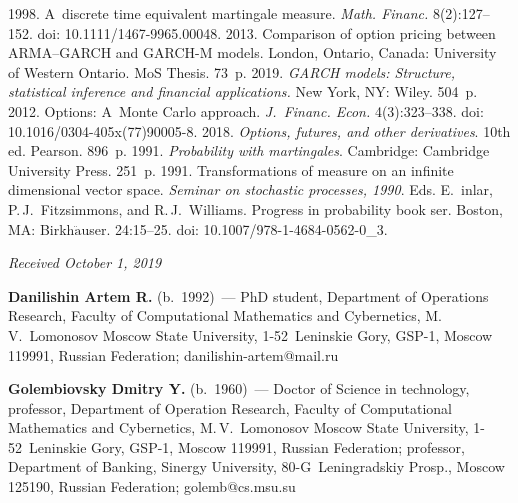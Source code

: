 \begin{multicols}{2}
{{\begin{thebibliography}{99}
 1998. A~discrete time equivalent martingale 
measure. \textit{Math. Financ.} 8(2):127--152. doi: 10.1111/1467-9965.00048.
 2013. Comparison of option pricing between ARMA--GARCH and 
GARCH-M models. London, Ontario, Canada: University of Western Ontario. MoS 
Thesis. 73~p.
 2019. \textit{GARCH models: Structure, 
statistical inference and financial applications.} New York, NY: Wiley. 504~p.
 2012. Options: A~Monte Carlo approach. \textit{J.~Financ. 
Econ.} 4(3):323--338.  doi: 10.1016/0304-405x(77)90005-8.
 2018. \textit{Options, futures, and other derivatives}. 10th ed. Pearson. 
896~p.
 1991. \textit{Probability with martingales}. Cambridge: 
Cambridge University Press. 251~p.
 1991. Transformations of measure on an infinite dimensional vector 
space. \textit{Seminar on stochastic processes, 1990}. Eds. \mbox{E.~{}inlar}, 
P.\,J.~Fitzsimmons, and R.\,J.~Williams. Progress in probability book ser. Boston, MA: 
Birkh$\ddot{\mbox{a}}$user. 
24:15--25. doi: 10.1007/978-1-4684-0562-0\_3.
\end{thebibliography}

 }
 }

\end{multicols}

\vspace*{-3pt}

\hfill{\small\textit{Received October 1, 2019}}




\Contr

\noindent
\textbf{Danilishin Artem R.} (b.\ 1992)~--- PhD student, Department of Operations Research, Faculty of 
Computational Mathematics and Cybernetics, M.\,V.~Lomonosov Moscow State University, 1-52~Leninskie 
Gory, GSP-1, Moscow 119991, Russian Federation; \mbox{danilishin-artem@mail.ru}

\vspace*{3pt}

\noindent
\textbf{Golembiovsky Dmitry Y.} (b.\ 1960)~--- Doctor of Science in technology, professor, Department of 
Operation Research, Faculty of Computational Mathematics and Cybernetics, M.\,V.~Lomonosov Moscow 
State University, 1-52~Leninskie Gory, GSP-1, Moscow 119991, Russian Federation; professor, Department 
of Banking, Sinergy University, 80-G~Leningradskiy Prosp., Moscow 125190, Russian Federation; 
\mbox{golemb@cs.msu.su}
\label{end\stat}

\renewcommand{\bibname}{\protect\rm Литература} 
      
 